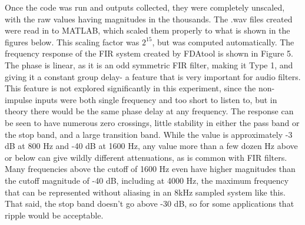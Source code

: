 \documentclass{bannerReport}
\begin{document}
Once the code was run and outputs collected, they were completely unscaled, with the raw values having magnitudes in the thousands. The {\mono *.wav} files created were read in to MATLAB, which scaled them properly to what is shown in the figures below. This scaling factor was $2^{15}$, but was computed automatically.
The frequency response of the FIR system created by FDAtool is shown in Figure 5. The phase is linear, as it is an odd symmetric FIR filter, making it Type 1, and giving it a constant group delay- a feature that is very important for audio filters. This feature is not explored significantly in this experiment, since the non-impulse inputs were both single frequency and too short to listen to, but in theory there would be the same phase delay at any frequency. The response can be seen to have numerous zero crossings, little stability in either the pass band or the stop band, and a large transition band. While the value is approximately -3 dB at 800 Hz and -40 dB at 1600 Hz, any value more than a few dozen Hz above or below can give wildly different attenuations, as is common with FIR filters. Many frequencies above the cutoff of 1600 Hz even have higher magnitudes than the cutoff magnitude of -40 dB, including at 4000 Hz, the maximum frequency that can be represented without aliasing in an 8kHz sampled system like this. That said, the stop band doesn’t go above -30 dB, so for some applications that ripple would be acceptable.
\end{document}
